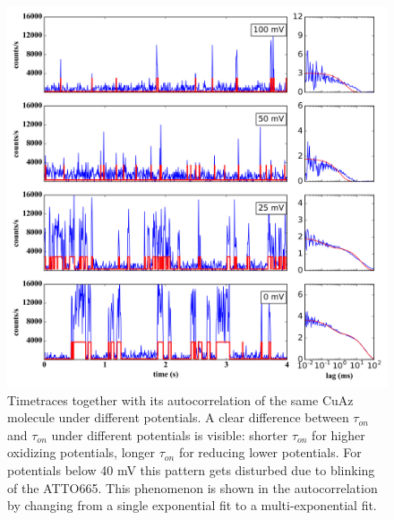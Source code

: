 \documentclass[twoside,single]{lion-msc}
\begin{document}
\begin{figure}[ht!]
\centering
\includegraphics[width=1\textwidth]{plots_timetraces_diff_pot}
\caption{Timetraces together with its autocorrelation of the same CuAz molecule under different potentials. A clear difference between $\tau_{on}$ and $\tau_{on}$ under different potentials is visible: shorter $\tau_{on}$ for higher oxidizing potentials, longer $\tau_{on}$ for reducing lower potentials. For potentials below 40 mV this pattern gets disturbed due to blinking of the ATTO665. This phenomenon is shown in the autocorrelation by changing from a single exponential fit to a multi-exponential fit.}
\label{plots_timetraces_diff_pot}
\end{figure}
\end{document}
